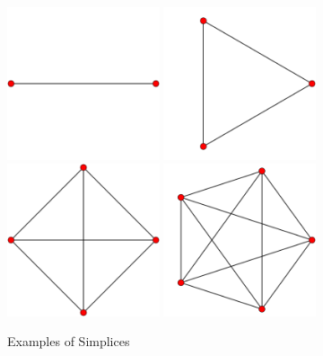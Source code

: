 \begin{figure}[h!]
  \centering
    \includegraphics[width=0.4\textwidth]{img/800px-1-simplex_t0.png}
    \includegraphics[width=0.4\textwidth]{img/800px-2-simplex_t0.png}
    \includegraphics[width=0.4\textwidth]{img/800px-3-simplex_t0.png}
    \includegraphics[width=0.4\textwidth]{img/800px-4-simplex_t0.png}
  \caption{Examples of Simplices}
  \label{fig:simplices}
\end{figure}

